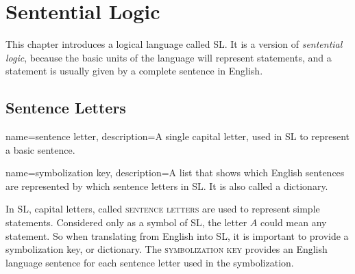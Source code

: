 \chapter{Sentential Logic}
\label{chap:SL}
\setlength{\parindent}{1em}

This chapter introduces a logical language called SL. It is a version of \emph{sentential logic}, because the basic units of the language will represent statements, and a statement is usually given by a complete sentence in English.



\section{Sentence Letters}


{
name=sentence letter,
description={A single capital letter, used in SL to represent a basic sentence.}
}

{
name=symbolization key,
description={A list that shows which English sentences are represented by which sentence letters in SL. It is also called a dictionary.}
}

In SL, capital letters, called \textsc{\glspl{sentence letter}} \label{def:sentence_letter} are used to represent simple statements. Considered only as a symbol of SL, the letter $A$ could mean any statement. So when translating from English into SL, it is important to provide a symbolization key, or dictionary. The \textsc{\gls{symbolization key}} \label{def:symbolization_key} provides an English language sentence for each sentence letter used in the symbolization.

